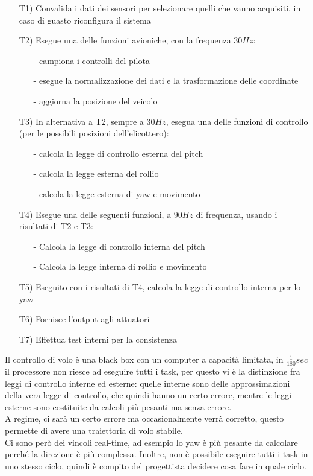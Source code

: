 \documentclass[12pt, oneside]{extbook}
\begin{document}
\begin{itemize}
\item[T1)] Convalida i dati dei sensori per selezionare quelli che vanno acquisiti, in caso di guasto riconfigura il sistema
\item[T2)] Esegue una delle funzioni avioniche, con la frequenza $30Hz$:
\begin{itemize}
\item[-] campiona i controlli del pilota
\item[-] esegue la normalizzazione dei dati e la trasformazione delle coordinate
\item[-] aggiorna la posizione del veicolo  
\end{itemize}
\item[T3)] In alternativa a T2, sempre a $30Hz$, esegua una delle funzioni di controllo (per le possibili posizioni dell'elicottero):
\begin{itemize}
\item[-] calcola la legge di controllo esterna del pitch
\item[-] calcola la legge esterna del rollio
\item[-] calcola la legge esterna di yaw e movimento
\end{itemize}
\item[T4)] Esegue una delle seguenti funzioni, a $90Hz$ di frequenza, usando i risultati di T2 e T3: 
\begin{itemize}
\item[-] Calcola la legge di controllo interna del pitch
\item[-] Calcola la legge interna di rollio  e movimento
\end{itemize}
\item[T5)] Eseguito con i risultati di T4, calcola la legge di controllo interna per lo yaw
\item[T6)] Fornisce l'output agli attuatori
\item[T7)] Effettua test interni per la consistenza
\end{itemize}
Il controllo di volo è una black box con un computer a capacità limitata, in $\frac{1}{180}sec$ il processore non riesce ad eseguire tutti i task, per questo vi è la distinzione fra leggi di controllo interne ed esterne: quelle interne sono delle approssimazioni della vera legge di controllo, che quindi hanno un certo errore, mentre le leggi esterne sono costituite da calcoli più pesanti ma senza errore.\\ A regime, ci sarà un certo errore ma occasionalmente verrà corretto, questo permette di avere una traiettoria di volo stabile.\\ Ci sono però dei vincoli real-time, ad esempio lo yaw è più pesante da calcolare perché la direzione è più complessa. Inoltre, non è possibile eseguire tutti i task in uno stesso ciclo, quindi è compito del progettista decidere cosa fare in quale ciclo.
\end{document}
